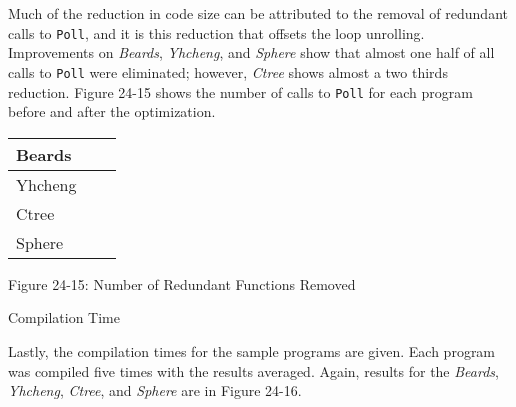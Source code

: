 Much of the reduction in code size can be attributed to the removal of
redundant calls to \texttt{Poll}, and it is this reduction that
offsets the loop unrolling. Improvements on \textit{Beards},
\textit{Yhcheng}, and \textit{Sphere} show that almost one half of all
calls to \texttt{Poll} were eliminated; however, \textit{Ctree} shows
almost a two thirds reduction. Figure 24-15 shows the number of calls
to \texttt{Poll} for each program before and after the optimization.

\begin{center}
\tabletail{}
\tablelasttail{}
\begin{supertabular}{|m{0.9406598in}|m{0.76435983in}|m{0.6712598in}|}
\hline
 Beards &
 &
\raggedleft{}\\\hline
 Yhcheng &
 &
\raggedleft{}\\\hline
 Ctree &
 &
\raggedleft{}\\\hline
 Sphere &
 &
\raggedleft{}\\\hline
\end{supertabular}
\end{center}
{\centering{}
Figure 24-15: Number of Redundant Functions Removed
\par}

{\sffamily
Compilation Time}

Lastly, the compilation times for the sample programs are given. Each
program was compiled five times with the results averaged. Again,
results for the \textit{Beards}, \textit{Yhcheng}, \textit{Ctree}, and
\textit{Sphere} are in Figure 24-16.

